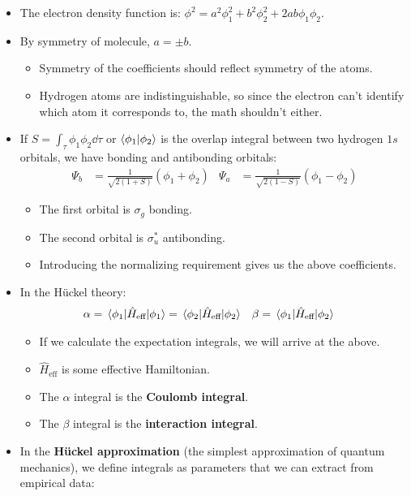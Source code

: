 \documentclass[../notes.tex]{subfiles}
\begin{document}
\begin{itemize}
\begin{itemize}
        \item The electron density function is: $\phi^2=a^2\phi_1^2+b^2\phi_2^2+2ab\phi_1\phi_2$.
        \item By symmetry of  molecule, $a=\pm b$.
        \begin{itemize}
            \item Symmetry of the coefficients should reflect symmetry of the atoms.
            \item Hydrogen atoms are indistinguishable, so since the electron can't identify which atom it corresponds to, the math shouldn't either.
        \end{itemize}
        \item If $S=\int_\tau\phi_1\phi_2\dd{\tau}$ or $\bra{\phi_1}\ket{\phi_2}$ is the overlap integral between two hydrogen $1s$ orbitals, we have bonding and antibonding orbitals:
        \begin{align*}
            \Psi_b &= \frac{1}{\sqrt{2(1+S)}}(\phi_1+\phi_2)&
                \Psi_a &= \frac{1}{\sqrt{2(1-S)}}(\phi_1-\phi_2)
        \end{align*}
        \begin{itemize}
            \item The first orbital is $\sigma_g$ bonding.
            \item The second orbital is $\sigma_u^*$ antibonding.
            \item Introducing the normalizing requirement gives us the above coefficients.
        \end{itemize}
        \item In the H\"{u}ckel theory:
        \begin{align*}
            \alpha &= \ev{\hat{H}_\text{eff}}{\phi_1} = \ev{\hat{H}_\text{eff}}{\phi_2}&
                \beta &= \mel{\phi_1}{\hat{H}_\text{eff}}{\phi_2}
        \end{align*}
        \begin{itemize}
            \item If we calculate the expectation integrals, we will arrive at the above.
            \item $\hat{H}_\text{eff}$ is some effective Hamiltonian.
            \item The $\alpha$ integral is the \textbf{Coulomb integral}.
            \item The $\beta$ integral is the \textbf{interaction integral}.
        \end{itemize}
        \item In the \textbf{H\"{u}ckel approximation} (the simplest approximation of quantum mechanics), we define integrals as parameters that we can extract from empirical data:

\end{itemize}
\end{itemize}
\end{document}
